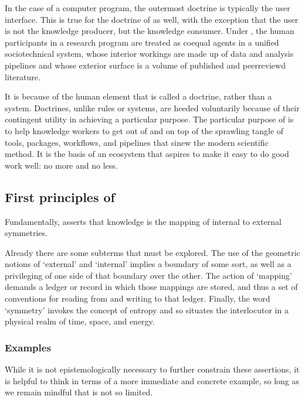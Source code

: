 \documentclass[letterpaper,10pt,english]{jupyterBook}
\begin{document}
\sphinxAtStartPar
In the case of a computer program, the outermost doctrine is typically the user interface. This is true for the doctrine of  as well, with the exception that the user is not the knowledge producer, but the knowledge consumer. Under , the human participants in a research program are treated as coequal agents in a unified sociotechnical system, whose interior workings are made up of data and analysis pipelines and whose exterior surface is a volume of published and peer\sphinxhyphen{}reviewd literature.

\sphinxAtStartPar
It is because of the human element that  is called a doctrine, rather than a system. Doctrines, unlike rules or systems, are heeded voluntarily because of their contingent utility in achieving a particular purpose. The particular purpose of  is to help knowledge workers to get out of and on top of the sprawling tangle of tools, packages, workflows, and pipelines that sinew the modern scientific method. It is the basis of an ecosystem that aspires to make it easy to do good work well: no more and no less.


\subsection{First principles of }
\label{\detokenize{content/chapter_03_everest/doctrine:first-principles-of-akp}}
\sphinxAtStartPar
Fundamentally,  asserts that knowledge is the mapping of internal to external symmetries.

\sphinxAtStartPar
Already there are some sub\sphinxhyphen{}terms that must be explored. The use of the geometric notions of ‘external’ and ‘internal’ implies a boundary of some sort, as well as a privileging of one side of that boundary over the other. The action of ‘mapping’ demands a ledger or record in which those mappings are stored, and thus a set of conventions for reading from and writing to that ledger. Finally, the word ‘symmetry’ invokes the concept of entropy and so situates the interlocutor in a physical realm of time, space, and energy.


\subsubsection{Examples}
\label{\detokenize{content/chapter_03_everest/doctrine:examples}}
\sphinxAtStartPar
While it is not epistemologically necessary to further constrain these assertions, it is helpful to think in terms of a more immediate and concrete example, so long as we remain mindful that  is not so limited.
\end{document}
